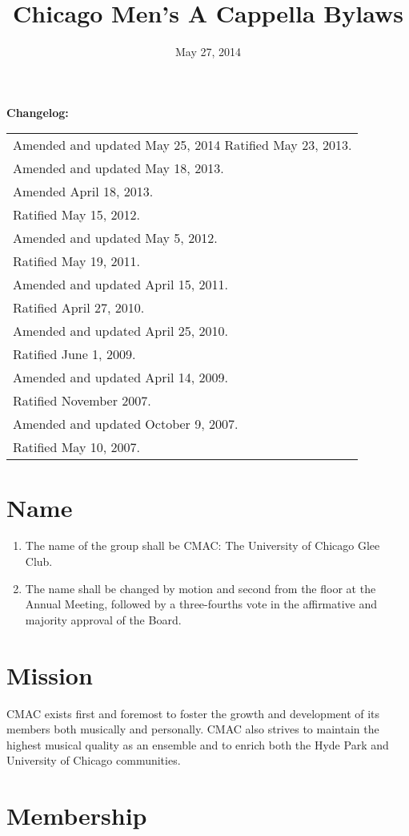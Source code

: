 \documentclass{article}
\title{Chicago Men's A Cappella Bylaws}
\date{May 27, 2014}
\providecommand{\tabularnewline}{\\}
\begin{document}
\maketitle

\noindent \textbf{Changelog:} \\
\begin{tabular}{l}
Amended and updated May 25, 2014
Ratified May 23, 2013. \tabularnewline
Amended and updated May 18, 2013. \tabularnewline
Amended April 18, 2013. \tabularnewline
Ratified May 15, 2012. \tabularnewline
Amended and updated May 5, 2012. \tabularnewline
Ratified May 19, 2011. \tabularnewline
Amended and updated April 15, 2011. \tabularnewline
Ratified April 27, 2010. \tabularnewline
Amended and updated April 25, 2010. \tabularnewline
Ratified June 1, 2009. \tabularnewline
Amended and updated April 14, 2009. \tabularnewline
Ratified November 2007. \tabularnewline
Amended and updated October 9, 2007. \tabularnewline
Ratified May 10, 2007. \tabularnewline
\end{tabular}

\noindent \newpage{}

\tableofcontents{}

\newpage{}
\section{Name}
\begin{enumerate}
\item The name of the group shall be CMAC: The University of Chicago Glee Club.
\item The name shall be changed by motion and second from the floor at the
Annual Meeting, followed by a three-fourths vote in the affirmative
and majority approval of the Board.
\end{enumerate}

\section{Mission}

CMAC exists first and foremost to foster the growth and development
of its members both musically and personally. CMAC also strives to
maintain the highest musical quality as an ensemble and to enrich
both the Hyde Park and University of Chicago communities.

\section{Membership} \label{membership}
\end{document}
